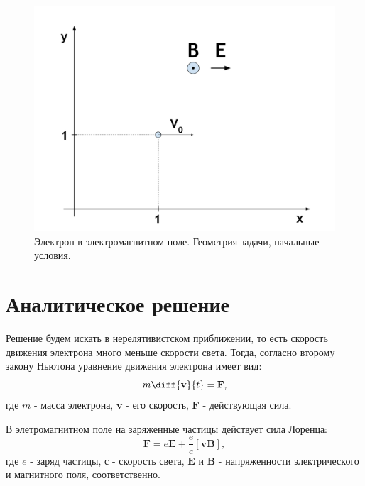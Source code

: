 \documentclass[a4paper]{article}
\begin{document}
\begin{figure}[h]\label{problem}

	\includegraphics[width=\textwidth]{problem.pdf}
	\caption{Электрон в электромагнитном поле. Геометрия задачи, начальные условия.}
\end{figure}

\section{Аналитическое решение}
Решение будем искать в нерелятивистском приближении, то есть скорость движения электрона много меньше скорости света. Тогда, согласно второму закону Ньютона уравнение движения электрона имеет вид:
\begin{equation}\label{motion}
m\diff{\mathbf{v}}{t} = \mathbf{F},
\end{equation}
где $m$ - масса электрона, $\mathbf{v}$ - его скорость, $\mathbf{F}$ - действующая сила.

В элетромагнитном поле на заряженные частицы действует сила Лоренца:
\begin{equation}\label{lorenz}
\mathbf{F} = e \mathbf{E} + \frac{e}{c}\left[\mathbf{vB}\right],
\end{equation}
где $e$ - заряд частицы, $с$ - скорость света, $\mathbf{E}$ и $\mathbf{B}$ - напряженности электрического и магнитного поля, соответственно.
\end{document}
